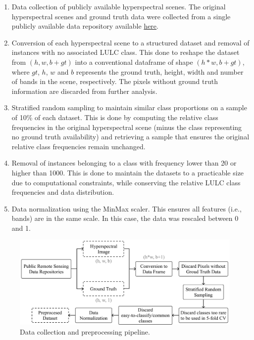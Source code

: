 \documentclass[preprint,12pt]{elsarticle}
\begin{document}
\begin{enumerate}
    
    \item Data collection of publicly available hyperspectral scenes.
        The original hyperspectral scenes and ground truth data were collected
        from a single publicly available data repository available
        \href{http://www.ehu.eus/ccwintco/index.php?title=Hyperspectral_Remote_Sensing_Scenes}{here}.

    \item Conversion of each hyperspectral scene to a structured
        dataset and removal of instances with no associated LULC class. This
        done to reshape the dataset from $(h,w,b+gt)$  into a conventional
        dataframe of shape $(h*w,b+gt)$, where $gt$, $h$, $w$ and $b$
        represents the ground truth, height, width and number of bands in the
        scene, respectively. The pixels without ground truth information are
        discarded from further analysis.

    \item Stratified random sampling to maintain similar class
        proportions on a sample of 10\% of each dataset. This is done by
        computing the relative class frequencies in the original hyperspectral
        scene (minus the class representing no ground truth availability) and
        retrieving a sample that ensures the original relative class
        frequencies remain unchanged.

    \item Removal of instances belonging to a class with frequency
        lower than 20 or higher than 1000. This is done to maintain the
        datasets to a practicable size due to computational constraints, while
        conserving the relative LULC class frequencies and data distribution. 

    \item Data normalization using the MinMax scaler. This ensures all
        features (i.e., bands) are in the same scale. In this case, the data
        was rescaled between 0 and 1.

\end{enumerate}

\begin{figure}
	\centering
    \captionsetup{justification=centering}
    \caption{Data collection and preprocessing pipeline.
    \vspace{.2cm}}
	\label{fig:data_preprocessing_pipeline}
	\includegraphics[width=\linewidth]{../analysis/data_preprocessing_pipeline}
\end{figure}
\end{document}
